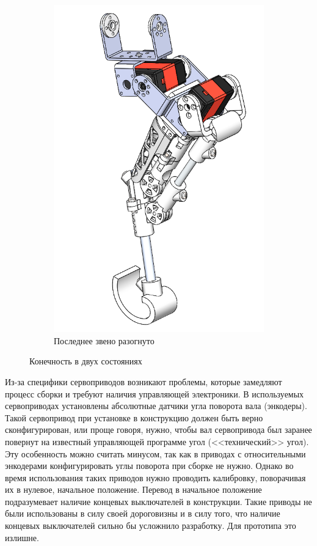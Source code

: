 \begin{figure}[ht]
\begin{subfigure}[b]{0.45\textwidth}
        \includegraphics[scale=0.55]{chapter_mechanics_construction/figure16.png}
        \caption{Последнее звено разогнуто}
    \end{subfigure}
     
    \caption{Конечность в двух состояниях}
    \label{fig:two_states}
\end{figure}

Из-за специфики сервоприводов возникают проблемы, которые замедляют процесс сборки и требуют наличия управляющей электроники. В используемых сервоприводах установлены абсолютные датчики угла поворота вала (энкодеры). Такой сервопривод при установке в конструкцию должен быть верно сконфигурирован, или проще говоря, нужно, чтобы вал сервопривода был заранее повернут на известный управляющей программе угол (<<технический>> угол). Эту особенность можно считать минусом, так как в приводах с относительными энкодерами конфигурировать углы поворота при сборке не нужно. Однако во время использования таких приводов нужно проводить калибровку, поворачивая их в нулевое, начальное положение. Перевод в начальное положение подразумевает наличие концевых выключателей в конструкции. Такие приводы не были использованы в силу своей дороговизны и в силу того, что наличие концевых выключателей сильно бы усложнило разработку. Для прототипа это излишне.

